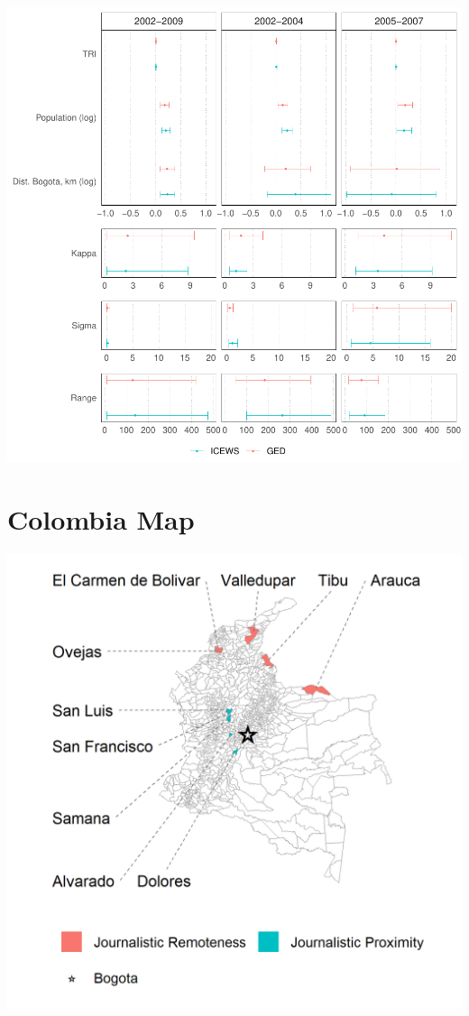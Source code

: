 \documentclass[
]{article}
\begin{document}
\begin{center}\includegraphics[width=1\linewidth]{INLA_Model_Tables_files/figure-latex/unnamed-chunk-7-1} \end{center}

\pagebreak

\hypertarget{colombia-map}{%
\section{Colombia Map}\label{colombia-map}}

\begin{center}\includegraphics[width=1\linewidth]{Map} \end{center}
\end{document}
